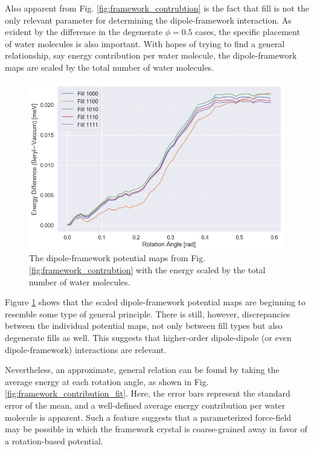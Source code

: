         Also apparent from Fig. \ref{fig:framework_contrubtion} is the fact that fill is not the only relevant parameter for determining the dipole-framework interaction. As evident by the difference in the degenerate $\phi = 0.5$ cases, the specific placement of water molecules is also important. With hopes of trying to find a general relationship, say energy contribution per water molecule, the dipole-framework maps are scaled by the total number of water molecules.
        
        \begin{figure}
            \centering
            \includegraphics[width=0.9\linewidth]{Figures/System/framework_contribution_scaled.png}
            \caption{The dipole-framework potential maps from Fig. \ref{fig:framework_contrubtion} with the energy scaled by the total number of water molecules.}
            \label{fig:framework_contribution_scaled}
        \end{figure}
        
        Figure \ref{fig:framework_contribution_scaled} shows that the scaled dipole-framework potential maps are beginning to resemble some type of general principle. There is still, however, discrepancies between the individual potential maps, not only between fill types but also degenerate fills as well. This suggests that higher-order dipole-dipole (or even dipole-framework) interactions are relevant. 
        
        Nevertheless, an approximate, general relation can be found by taking the average energy at each rotation angle, as shown in Fig. \ref{fig:framework_contribution_fit}. Here, the error bars represent the standard error of the mean, and a well-defined average energy contribution per water molecule is apparent. Such a feature suggests that a parameterized force-field may be possible in which the framework crystal is coarse-grained away in favor of a rotation-based potential. 
        

